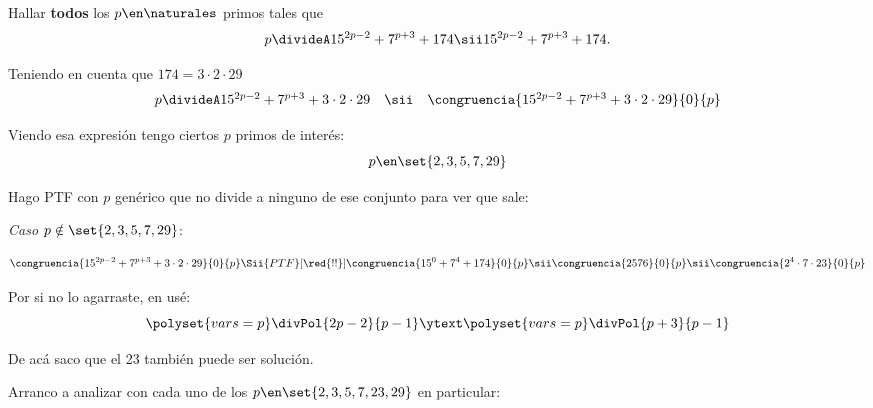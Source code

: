 \begin{enunciado}{\ejExtra}
  Hallar \textbf{todos} los $p \en \naturales$ primos tales que
  $$
    p \divideA 15^{2p-2} + 7^{p+3} + 174
    \sii
    15^{2p-2} + 7^{p+3} + 174.
  $$
\end{enunciado}

Teniendo en cuenta que $174 = 3 \cdot 2 \cdot 29$
$$
  \begin{array}{rcl}
    p \divideA 15^{2p-2} + 7^{p+3} + 3 \cdot 2 \cdot 29
     & \sii &
    \congruencia{15^{2p-2} + 7^{p+3} +3 \cdot 2 \cdot 29}{0}{p}
  \end{array}
$$

Viendo esa expresión tengo ciertos $p$ primos de interés:
$$
  p \en \set{2, 3, 5, 7, 29}
$$

Hago PTF con $p$ genérico que no divide a ninguno de ese conjunto para ver que sale:

\textit{Caso $p \notin\set{2, 3, 5, 7, 29}$}:\par
$$
  \congruencia{15^{2p-2} + 7^{p+3} +3 \cdot 2 \cdot 29}{0}{p}
  \Sii{PTF}[\red{!!}]
  \congruencia{15^0 + 7^4 + 174}{0}{p}
  \sii
  \congruencia{2576}{0}{p}
  \sii
  \congruencia{2^4 \cdot 7 \cdot 23}{0}{p}
$$

Por si no lo agarraste, en \red{!!} usé:
$$
  \polyset{vars=p}
  \divPol{2p - 2}{p-1}
  \ytext
  \polyset{vars=p}
  \divPol{p + 3}{p-1}
$$

De acá saco que el 23 también puede ser solución.\par
Arranco a analizar con cada uno de los  $p \en \set{2, 3, 5, 7, 23, 29}$ en particular:


